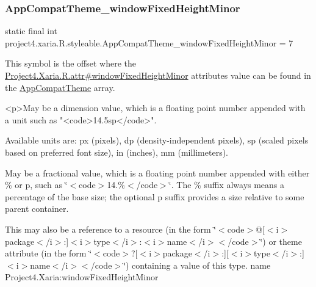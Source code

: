 \subsubsection{\texorpdfstring{App\+Compat\+Theme\+\_\+window\+Fixed\+Height\+Minor}{AppCompatTheme\_windowFixedHeightMinor}}
{\footnotesize\ttfamily static final int project4.\+xaria.\+R.\+styleable.\+App\+Compat\+Theme\+\_\+window\+Fixed\+Height\+Minor = 7\hspace{0.3cm}{\ttfamily [static]}}

This symbol is the offset where the \hyperlink{}{Project4.\+Xaria.\+R.\+attr\#window\+Fixed\+Height\+Minor} attribute\textquotesingle{}s value can be found in the \hyperlink{classproject4_1_1xaria_1_1R_1_1styleable_aad8bec413e2350f9404e6ff0e831a85d}{App\+Compat\+Theme} array.

\begin{DoxyVerb}      <p>May be a dimension value, which is a floating point number appended with a unit such as "<code>14.5sp</code>".
\end{DoxyVerb}
 Available units are\+: px (pixels), dp (density-\/independent pixels), sp (scaled pixels based on preferred font size), in (inches), mm (millimeters). 

May be a fractional value, which is a floating point number appended with either \% or p, such as \char`\"{}$<$code$>$14.\%$<$/code$>$\char`\"{}. The \% suffix always means a percentage of the base size; the optional p suffix provides a size relative to some parent container. 

This may also be a reference to a resource (in the form \char`\"{}$<$code$>$@\mbox{[}$<$i$>$package$<$/i$>$\+:\mbox{]}$<$i$>$type$<$/i$>$\+:$<$i$>$name$<$/i$>$$<$/code$>$\char`\"{}) or theme attribute (in the form \char`\"{}$<$code$>$?\mbox{[}$<$i$>$package$<$/i$>$\+:\mbox{]}\mbox{[}$<$i$>$type$<$/i$>$\+:\mbox{]}$<$i$>$name$<$/i$>$$<$/code$>$\char`\"{}) containing a value of this type.  name Project4.\+Xaria\+:window\+Fixed\+Height\+Minor \mbox{\label{classproject4_1_1xaria_1_1R_1_1styleable_ad301f019de6ddcbce43d7e5d1f6e3e25}} 
